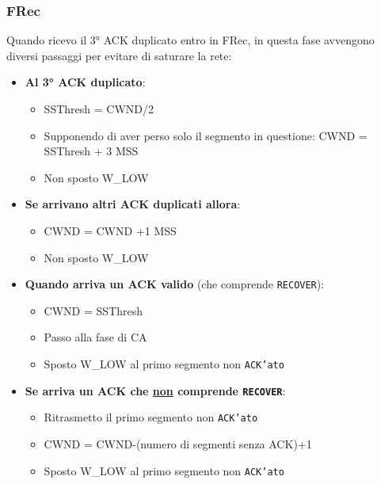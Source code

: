         \subsubsection{\acrfull*{FRec}}
            Quando ricevo il 3° \Acrshort*{ACK} duplicato entro in \Acrlong*{FRec}, in questa fase avvengono diversi passaggi per evitare di saturare la rete: \begin{itemize}
                \item \textbf{Al 3° \Acrshort*{ACK} duplicato}:\begin{itemize}
                    \item \Acrshort*{SSThresh} = \Acrshort*{CWND}/2
                    \item Supponendo di aver perso solo il segmento in questione: \Acrshort*{CWND} = \Acrshort*{SSThresh} + 3 \Acrshort*{MSS}
                    \item Non sposto \Acrshort*{W_LOW}
                \end{itemize}
                \item \textbf{Se arrivano altri \Acrshort*{ACK} duplicati allora}: \begin{itemize}
                    \item \Acrshort*{CWND} = \Acrshort*{CWND} +1 \Acrshort*{MSS}
                    \item Non sposto \Acrshort*{W_LOW}
                \end{itemize}
                \item \textbf{Quando arriva un \Acrshort*{ACK} valido} (che comprende \texttt{RECOVER}): \begin{itemize}
                    \item \Acrshort*{CWND} = \Acrshort*{SSThresh}
                    \item Passo alla fase di \Acrlong*{CA}
                    \item Sposto \Acrshort*{W_LOW} al primo segmento non \texttt{ACK'ato}
                \end{itemize}
                \item \textbf{Se arriva un \Acrshort*{ACK} che \underline{non} comprende \texttt{RECOVER}}:\begin{itemize}
                    \item Ritrasmetto il primo segmento non \texttt{ACK'ato}
                    \item \Acrshort*{CWND} = \Acrshort*{CWND}-(numero di segmenti senza \Acrshort*{ACK})+1
                    \item Sposto \Acrshort*{W_LOW} al primo segmento non \texttt{ACK'ato}
                \end{itemize}
            \end{itemize}
            
